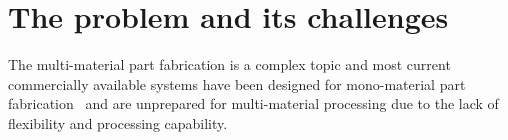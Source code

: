 \chapter{The problem and its challenges}
\label{ch:prob-challenge}
  The multi-material part fabrication is a complex topic and most current
  commercially available systems have been designed for mono-material part
  fabrication~\cite{wohlers2011wohlers} and are unprepared for multi-material
  processing due to the lack of flexibility and processing capability. 
